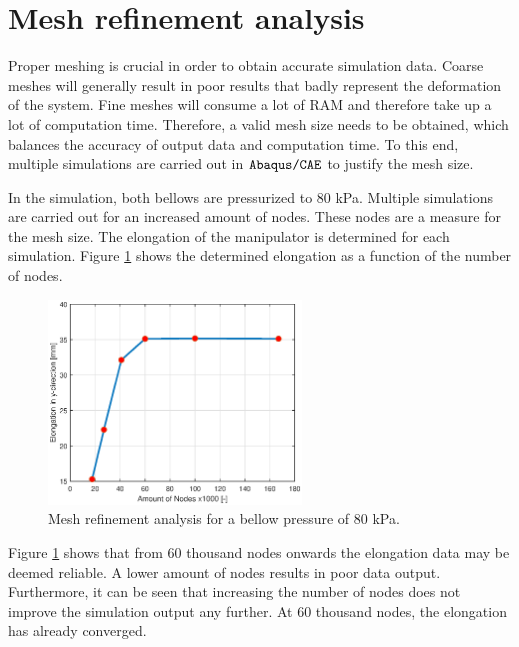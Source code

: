 \label{app:chap3}


\section{Mesh refinement analysis}

Proper meshing is crucial in order to obtain accurate simulation data. Coarse meshes will generally result in poor results that badly represent the deformation of the system. Fine meshes will consume a lot of RAM and therefore take up a lot of computation time. Therefore, a valid mesh size needs to be obtained, which balances the accuracy of output data and computation time. To this end, multiple simulations are carried out in $\verb+Abaqus/CAE+$ to justify the mesh size.

In the simulation, both bellows are pressurized to $80$ kPa. Multiple simulations are carried out for an increased amount of nodes. These nodes are a measure for the mesh size. The elongation of the manipulator is determined for each simulation. Figure \ref{fig3:meshrefinement} shows the determined elongation as a function of the number of nodes.

\begin{figure}[H]
    \centering
    \includegraphics[width = 0.6\textwidth]{Figures/Chapter2/MeshRefinement.eps}
    \caption{Mesh refinement analysis for a bellow pressure of $80$ kPa.}
    \label{fig3:meshrefinement}
\end{figure}


Figure \ref{fig3:meshrefinement} shows that from 60 thousand nodes onwards the elongation data may be deemed reliable. A lower amount of nodes results in poor data output. Furthermore, it can be seen that increasing the number of nodes does not improve the simulation output any further. At 60 thousand nodes, the elongation has already converged.




